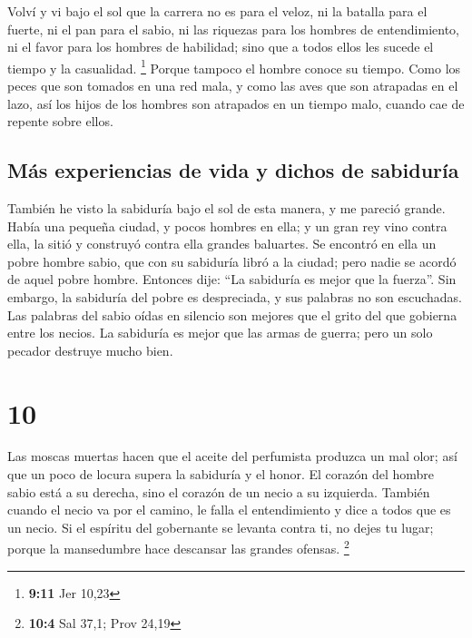  Volví y vi bajo el sol que la carrera no es para el
veloz, ni la batalla para el fuerte, ni el pan para el sabio, ni las
riquezas para los hombres de entendimiento, ni el favor para los hombres
de habilidad; sino que a todos ellos les sucede el tiempo y la
casualidad. \footnote{\textbf{9:11} Jer 10,23}  Porque
tampoco el hombre conoce su tiempo. Como los peces que son tomados en
una red mala, y como las aves que son atrapadas en el lazo, así los
hijos de los hombres son atrapados en un tiempo malo, cuando cae de
repente sobre ellos.

\hypertarget{muxe1s-experiencias-de-vida-y-dichos-de-sabiduruxeda}{%
\subsection{Más experiencias de vida y dichos de
sabiduría}\label{muxe1s-experiencias-de-vida-y-dichos-de-sabiduruxeda}}

 También he visto la sabiduría bajo el sol de esta
manera, y me pareció grande.  Había una pequeña ciudad, y
pocos hombres en ella; y un gran rey vino contra ella, la sitió y
construyó contra ella grandes baluartes.  Se encontró en
ella un pobre hombre sabio, que con su sabiduría libró a la ciudad; pero
nadie se acordó de aquel pobre hombre.  Entonces dije:
``La sabiduría es mejor que la fuerza''. Sin embargo, la sabiduría del
pobre es despreciada, y sus palabras no son escuchadas. 
Las palabras del sabio oídas en silencio son mejores que el grito del
que gobierna entre los necios.  La sabiduría es mejor que
las armas de guerra; pero un solo pecador destruye mucho bien.

\hypertarget{section-9}{%
\section{10}\label{section-9}}

 Las moscas muertas hacen que el aceite del perfumista
produzca un mal olor; así que un poco de locura supera la sabiduría y el
honor.  El corazón del hombre sabio está a su derecha,
sino el corazón de un necio a su izquierda.  También
cuando el necio va por el camino, le falla el entendimiento y dice a
todos que es un necio.  Si el espíritu del gobernante se
levanta contra ti, no dejes tu lugar; porque la mansedumbre hace
descansar las grandes ofensas. \footnote{\textbf{10:4} Sal 37,1; Prov
  24,19}

